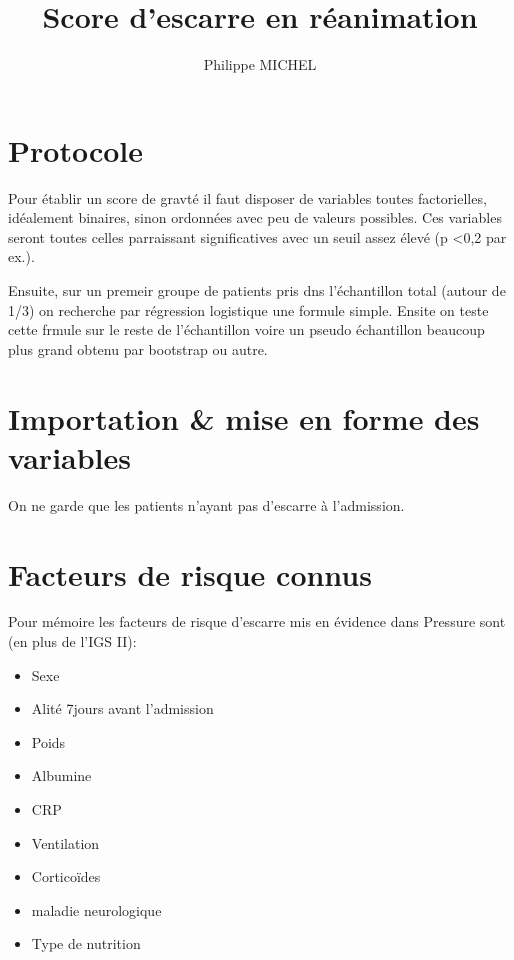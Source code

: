 \documentclass[]{article}
\title{Score d'escarre en réanimation}
\author{Philippe MICHEL}
\date{}
\providecommand{\tightlist}{%
  \setlength{\itemsep}{0pt}\setlength{\parskip}{0pt}}
\begin{document}
\maketitle

{
\setcounter{tocdepth}{2}
\tableofcontents
}
\hypertarget{protocole}{%
\section{Protocole}\label{protocole}}

Pour établir un score de gravté il faut disposer de variables toutes
factorielles, idéalement binaires, sinon ordonnées avec peu de valeurs
possibles. Ces variables seront toutes celles parraissant significatives
avec un seuil assez élevé (p \textless{}0,2 par ex.).

Ensuite, sur un premeir groupe de patients pris dns l'échantillon total
(autour de 1/3) on recherche par régression logistique une formule
simple. Ensite on teste cette frmule sur le reste de l'échantillon voire
un pseudo échantillon beaucoup plus grand obtenu par bootstrap ou autre.

\hypertarget{importation-mise-en-forme-des-variables}{%
\section{Importation \& mise en forme des
variables}\label{importation-mise-en-forme-des-variables}}

On ne garde que les patients n'ayant pas d'escarre à l'admission.

\hypertarget{facteurs-de-risque-connus}{%
\section{Facteurs de risque connus}\label{facteurs-de-risque-connus}}

Pour mémoire les facteurs de risque d'escarre mis en évidence dans
Pressure sont (en plus de l'IGS II):

\begin{itemize}
\tightlist
\item
  Sexe
\item
  Alité 7jours avant l'admission
\item
  Poids
\item
  Albumine
\item
  CRP
\item
  Ventilation
\item
  Corticoïdes
\item
  maladie neurologique
\item
  Type de nutrition
\end{itemize}
\end{document}
